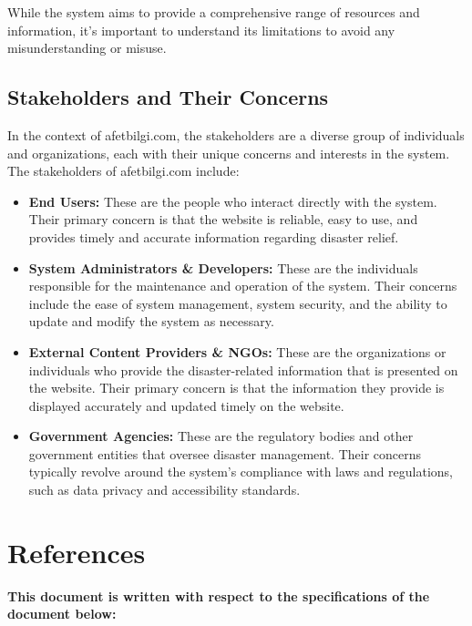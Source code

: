 \documentclass[12pt, letterpaper]{article}
\begin{document}
While the system aims to provide a comprehensive range of resources and information, it's important to understand its limitations to avoid any misunderstanding or misuse.

\subsection{Stakeholders and Their Concerns}
In the context of afetbilgi.com, the stakeholders are a diverse group of individuals and organizations, each with their unique concerns and interests in the system. The stakeholders of afetbilgi.com include:

\begin{itemize}
    \item \textbf{End Users:} These are the people who interact directly with the system. Their primary concern is that the website is reliable, easy to use, and provides timely and accurate information regarding disaster relief.
    
    \item \textbf{System Administrators \& Developers:} These are the individuals responsible for the maintenance and operation of the system. Their concerns include the ease of system management, system security, and the ability to update and modify the system as necessary.

    \item \textbf{External Content Providers \& NGOs:} These are the organizations or individuals who provide the disaster-related information that is presented on the website. Their primary concern is that the information they provide is displayed accurately and updated timely on the website.

    \item \textbf{Government Agencies:} These are the regulatory bodies and other government entities that oversee disaster management. Their concerns typically revolve around the system's compliance with laws and regulations, such as data privacy and accessibility standards.
\end{itemize}

\newpage

\section{References}
\textbf{This document is written with respect to the specifications of the document below:} 
\vspace{0.2cm}
\end{document}
